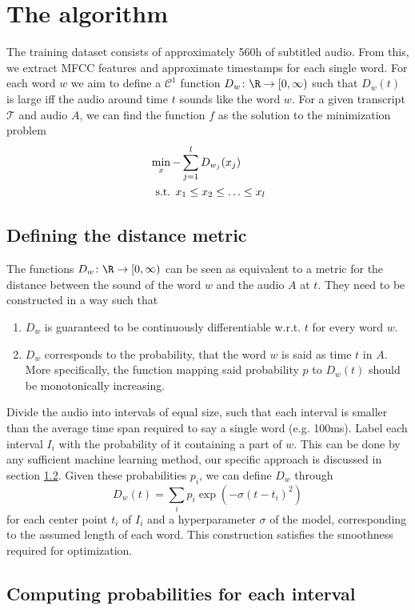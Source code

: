 \chapter{The algorithm}

The training dataset consists of approximately 560h of subtitled audio. From this, we extract MFCC features and approximate timestamps for each single word. For each word $w$ we aim to define a $\mathcal{C}^1$ function \(D_w\colon \R \to \lbrack 0, \infty)\) such that $D_w(t)$ is large iff the audio around time $t$ sounds like the word $w$. For a given transcript $\mathcal{T}$ and audio $A$, we can find the function $f$ as the solution to the minimization problem
\begin{align*}
	&\min_x -\sum_{j=1}^l D_{w_j}(x_j)\\
	&\hspace{0.5em}\text{s.t. }x_1\leq x_2\leq \dotsc\leq x_l
\end{align*}

\section{Defining the distance metric}

The functions \(D_w\colon \R \to \lbrack 0, \infty)\) can be seen as equivalent to a metric for the distance between the sound of the word $w$ and the audio $A$ at $t$. They need to be constructed in a way such that
\begin{enumerate}
	\item $D_w$ is guaranteed to be continuously differentiable w.r.t. $t$ for every word $w$.
	\item $D_w$ corresponds to the probability, that the word $w$ is said as time $t$ in $A$. More specifically, the function mapping said probability $p$ to $D_w(t)$ should be monotonically increasing.
\end{enumerate}

Divide the audio into intervals of equal size, such that each interval is smaller than the average time span required to say a single word (e.g. 100ms). Label each interval $I_i$ with the probability of it containing a part of $w$. This can be done by any sufficient machine learning method, our specific approach is discussed in section \ref{interval_word_prob}. Given these probabilities $p_i$, we can define $D_w$ through
\[
	D_w(t) = \sum_i p_i \exp(-\sigma(t-t_i)^2)
\]
for each center point $t_i$ of $I_i$ and a hyperparameter $\sigma$ of the model, corresponding to the assumed length of each word. This construction satisfies the smoothness required for optimization.

\section{Computing probabilities for each interval}
\label{interval_word_prob}

